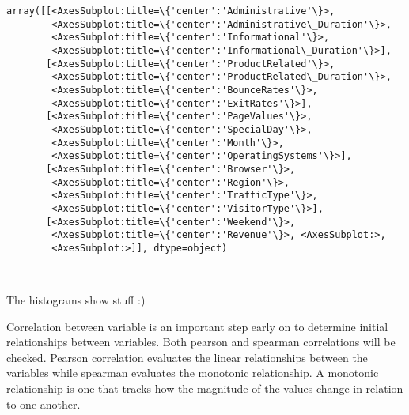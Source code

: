 \documentclass[11pt]{article}
\makeatletter
\newcommand{\boxspacing}{\kern\kvtcb@left@rule\kern\kvtcb@boxsep}
\newcommand{\prompt}[4]{
        {\ttfamily\llap{{\color{#2}[#3]:\hspace{3pt}#4}}\vspace{-\baselineskip}}
    }
\makeatother
\begin{document}
            \begin{tcolorbox}[breakable, size=fbox, boxrule=.5pt, pad at break*=1mm, opacityfill=0]
\prompt{Out}{outcolor}{6}{\boxspacing}
\begin{Verbatim}[commandchars=\\\{\}]
array([[<AxesSubplot:title=\{'center':'Administrative'\}>,
        <AxesSubplot:title=\{'center':'Administrative\_Duration'\}>,
        <AxesSubplot:title=\{'center':'Informational'\}>,
        <AxesSubplot:title=\{'center':'Informational\_Duration'\}>],
       [<AxesSubplot:title=\{'center':'ProductRelated'\}>,
        <AxesSubplot:title=\{'center':'ProductRelated\_Duration'\}>,
        <AxesSubplot:title=\{'center':'BounceRates'\}>,
        <AxesSubplot:title=\{'center':'ExitRates'\}>],
       [<AxesSubplot:title=\{'center':'PageValues'\}>,
        <AxesSubplot:title=\{'center':'SpecialDay'\}>,
        <AxesSubplot:title=\{'center':'Month'\}>,
        <AxesSubplot:title=\{'center':'OperatingSystems'\}>],
       [<AxesSubplot:title=\{'center':'Browser'\}>,
        <AxesSubplot:title=\{'center':'Region'\}>,
        <AxesSubplot:title=\{'center':'TrafficType'\}>,
        <AxesSubplot:title=\{'center':'VisitorType'\}>],
       [<AxesSubplot:title=\{'center':'Weekend'\}>,
        <AxesSubplot:title=\{'center':'Revenue'\}>, <AxesSubplot:>,
        <AxesSubplot:>]], dtype=object)
\end{Verbatim}
\end{tcolorbox}
        
    \begin{center}
    \end{center}
    { \hspace*{\fill} \\}
    
    The histograms show stuff :)

    Correlation between variable is an important step early on to determine
initial relationships between variables. Both pearson and spearman
correlations will be checked. Pearson correlation evaluates the linear
relationships between the variables while spearman evaluates the
monotonic relationship. A monotonic relationship is one that tracks how
the magnitude of the values change in relation to one another.
\end{document}
